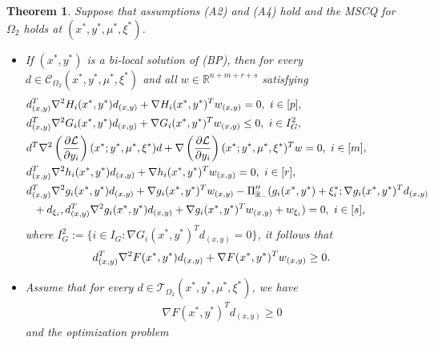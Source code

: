 \documentclass[11pt]{article}
\newtheorem{theorem}{Theorem}[section]
\theoremstyle{definition}
\theoremstyle{remark}
\numberwithin{equation}{section}
\begin{document}
\begin{theorem}\label{thm SOSC for FP}
 Suppose that assumptions  \textnormal{(A2)} and \textnormal{(A4)}  hold and the MSCQ for $\Omega_2$ holds at $(x^*,y^*,\mu^*,\xi^*)$.
  \begin{itemize}
    \item[(i)]If $(x^*,y^*)$ is a bi-local solution of (BP),
 then for every $d\in
      \mathcal{C}_{\Omega_2}(x^*,y^*,\mu^*,\xi^*)$ and all $w\in \mathbb{R}^{n+m+r+s}$ satisfying
      \begin{subequations}\label{second-order tangent set of Omega_2}
      \begin{align}
      \label{Omega_2 a}
 &  d_{(x,y)}^T\nabla^2 H_i(x^*, y^*)d_{(x,y)}  +\nabla H_i(x^*, y^*)^{T}w_{(x,y)}=0,~ i\in[p], \\
 \label{Omega_2 b}
 &    d_{(x,y)}^T\nabla^2 G_i(x^*, y^*)d_{(x,y)}  +\nabla G_i(x^*, y^*)^{T}w_{(x,y)}\le0,~ i\in I_G^2,\\
 \label{Omega_2 c}
   &d^T\nabla^2 \left(\frac{\partial\mathcal{L}}{\partial y_i}\right)(x^*; y^*,\mu^*,\xi^*)d  +\nabla
   \left(\frac{\partial\mathcal{L}}{\partial y_i}\right)(x^*; y^*,\mu^*,\xi^*)^{T}w=0,~ i\in[m] ,\\
   \label{Omega_2 d}
   & d_{(x,y)}^T\nabla^2 h_i(x^*, y^*)d_{(x,y)}  +\nabla h_i(x^*, y^*)^{T}w_{(x,y)}=0,~ i\in[r], \\
& d_{(x,y)}^T\nabla^2 g_i(x^*, y^*)d_{(x,y)} +\nabla g_i(x^*,
             y^*)^{T}w_{(x,y)}-\Pi_{\mathbb{R}_-}''(g_i(x^*,y^*)+\xi_i^*;\nabla g_i(x^*, y^*)^{T}d_{(x,y)}\notag\\
\label{Omega_2 e}
&~~+d_{\xi_i},d_{(x,y)}^T\nabla^2 g_i(x^*, y^*)d_{(x,y)}+\nabla g_i(x^*, y^*)^{T}w_{(x,y)}+w_{\xi_i})=0,~ i\in [s],
      \end{align}
       \end{subequations}
      where $I_G^2:=\{i\in I_G:\nabla G_i(x^*, y^*)^{T} d_{(x,y)}=0\}$,
       it follows that
   \begin{align}%
      &  d_{(x,y)}^T\nabla^2 F(x^*, y^*) d_{(x,y)}+\nabla F(x^*, y^*)^{T} w_{(x,y)}\ge 0.\notag
   \end{align}
    \item [(ii)]Assume that for every
        $d\in\mathcal{T}_{\Omega_2}(x^*,y^*,\mu^*,\xi^*)$, we have
 \begin{align*}
   & \nabla F(x^*, y^*)^{T} d_{(x,y)}\ge 0
 \end{align*} and  the optimization problem
   \begin{align}%

\end{align}
\end{itemize}
\end{theorem}
\end{document}

